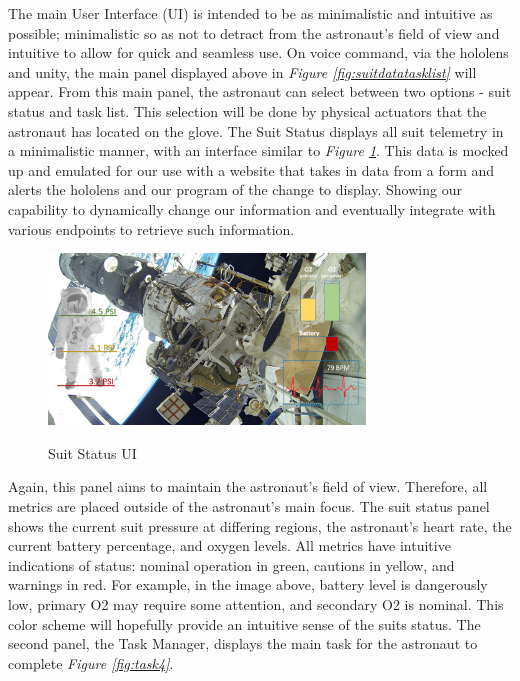 \documentclass{article}
\begin{document}
The main User Interface (UI) is intended to be as minimalistic and intuitive as possible; minimalistic so as not to detract from the astronaut’s field of view and intuitive to allow for quick and seamless use. On voice command, via the hololens and unity, the main panel displayed above in \textit{Figure \ref{fig:suitdatatasklist}} will appear. From this main panel, the astronaut can select between two options - suit status and task list. This selection will be done by physical actuators that the astronaut has located on the glove. The Suit Status displays all suit telemetry in a minimalistic manner, with an interface similar to \textit{Figure \ref{fig:moresuitmetrics}}. This data is mocked up and emulated for our use with a website that takes in data from a form and alerts the hololens and our program of the change to display. Showing our capability to dynamically change our information and eventually integrate with various endpoints to retrieve such information.

\begin{figure}[!htb]
  \centering
  \caption{Suit Status UI}
  \includegraphics[width=0.75\textwidth]{assets/moresuitmetrics.png}
  \label{fig:moresuitmetrics}
\end{figure}

Again, this panel aims to maintain the astronaut’s field of view. Therefore, all metrics are placed outside of the astronaut’s main focus. The suit status panel shows the current suit pressure at differing regions, the astronaut’s heart rate, the current battery percentage, and oxygen levels. All metrics have intuitive indications of status: nominal operation in green, cautions in yellow, and warnings in red. For example, in the image above, battery level is dangerously low, primary O2 may require some attention, and secondary O2 is nominal. This color scheme will hopefully provide an intuitive sense of the suits status. The second panel, the Task Manager, displays the main task for the astronaut to complete \textit{Figure \ref{fig:task4}}.
\end{document}
